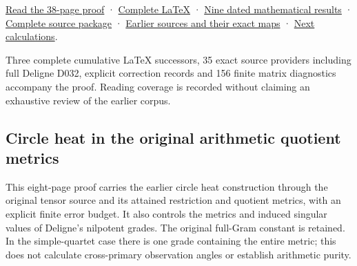 \documentclass[
]{article}
\begin{document}
\href{https://github.com/KokunoYumeto/zeta-function-research-reader/blob/main/workbenches/splitzero-tandem/continuations/20260919-corpus-cohomology-metric-receivers/CORPUS_RECEIVERS_AND_METRIC_CONTROL.pdf}{Read
the 38-page proof} ·
\href{https://github.com/KokunoYumeto/zeta-function-research-reader/blob/main/workbenches/splitzero-tandem/continuations/20260919-corpus-cohomology-metric-receivers/CORPUS_RECEIVERS_AND_METRIC_CONTROL.tex}{Complete
LaTeX} ·
\href{https://github.com/KokunoYumeto/zeta-function-research-reader/blob/main/workbenches/splitzero-tandem/continuations/20260919-corpus-cohomology-metric-receivers/NEW_RESULTS_2026-09-19.md}{Nine
dated mathematical results} ·
\href{https://github.com/KokunoYumeto/zeta-function-research-reader/blob/main/workbenches/splitzero-tandem/continuations/20260919-corpus-cohomology-metric-receivers/README.md}{Complete
source package} ·
\href{https://github.com/KokunoYumeto/zeta-function-research-reader/blob/main/workbenches/splitzero-tandem/continuations/20260919-corpus-cohomology-metric-receivers/SOURCE_RECEIVERS.md}{Earlier
sources and their exact maps} ·
\href{https://github.com/KokunoYumeto/zeta-function-research-reader/blob/main/workbenches/splitzero-tandem/continuations/20260919-corpus-cohomology-metric-receivers/CONTINUATION.md}{Next
calculations}.

Three complete cumulative LaTeX successors, 35 exact source providers
including full Deligne D032, explicit correction records and 156 finite
matrix diagnostics accompany the proof. Reading coverage is recorded
without claiming an exhaustive review of the earlier corpus.

\subsection{Circle heat in the original arithmetic quotient
metrics}\label{circle-heat-in-the-original-arithmetic-quotient-metrics}

This eight-page proof carries the earlier circle heat construction
through the original tensor source and its attained restriction and
quotient metrics, with an explicit finite error budget. It also controls
the metrics and induced singular values of Deligne's nilpotent grades.
The original full-Gram constant is retained. In the simple-quartet case
there is one grade containing the entire metric; this does not calculate
cross-primary observation angles or establish arithmetic purity.
\end{document}

